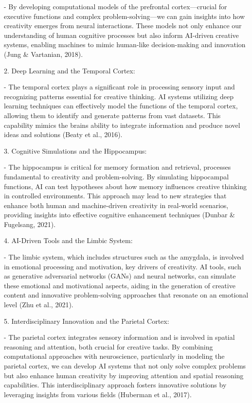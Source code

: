 \documentclass[
]{article}
\begin{document}
- By developing computational models of the prefrontal cortex---crucial
for executive functions and complex problem-solving---we can gain
insights into how creativity emerges from neural interactions. These
models not only enhance our understanding of human cognitive processes
but also inform AI-driven creative systems, enabling machines to mimic
human-like decision-making and innovation (Jung \& Vartanian, 2018).

2. Deep Learning and the Temporal Cortex:

- The temporal cortex plays a significant role in processing sensory
input and\\
recognizing patterns essential for creative thinking. AI systems
utilizing deep learning techniques can effectively model the functions
of the temporal cortex, allowing them to identify and generate patterns
from vast datasets. This capability mimics the brain\textquotesingle s
ability to integrate information and produce novel ideas and solutions
(Beaty et al., 2016).

3. Cognitive Simulations and the Hippocampus:

- The hippocampus is critical for memory formation and retrieval,
processes\\
fundamental to creativity and problem-solving. By simulating hippocampal
functions, AI can test hypotheses about how memory influences creative
thinking in controlled environments. This approach may lead to new
strategies that enhance both human and machine-driven creativity in
real-world scenarios, providing insights into effective cognitive
enhancement techniques (Dunbar \& Fugelsang, 2021).

4. AI-Driven Tools and the Limbic System:

- The limbic system, which includes structures such as the amygdala, is
involved in emotional processing and motivation, key drivers of
creativity. AI tools, such as generative adversarial networks (GANs) and
neural networks, can simulate these emotional and motivational aspects,
aiding in the generation of creative content and innovative
problem-solving approaches that resonate on an emotional level (Zhu et
al., 2021).

5. Interdisciplinary Innovation and the Parietal Cortex:

- The parietal cortex integrates sensory information and is involved in
spatial reasoning and attention, both crucial for creative tasks. By
combining computational approaches with neuroscience, particularly in
modeling the parietal cortex, we can develop AI systems that not only
solve complex problems but also enhance human creativity by improving
attention and spatial reasoning capabilities. This interdisciplinary
approach fosters innovative solutions by leveraging insights from
various fields (Huberman et al., 2017).
\end{document}
